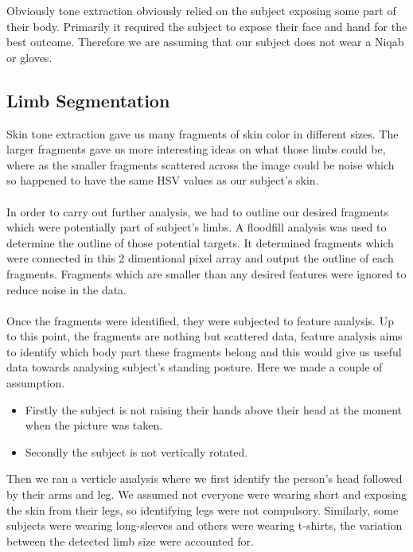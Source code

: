 \documentclass[10pt,journal,compsoc]{IEEEtran}
\begin{document}
Obviously tone extraction obviously relied on the subject exposing some part of their body. Primarily it required the subject to expose their face and hand for the best outcome. Therefore we are assuming that our subject does not wear a Niqab or gloves. 


\subsection{Limb Segmentation}
Skin tone extraction gave us many fragments of skin color in different sizes. The larger fragments gave us more interesting ideas on what those limbs could be, where as the smaller fragments scattered across the image could be noise which so happened to have the same HSV values as our subject's skin.\cite{Marvin}
\\ \\
In order to carry out further analysis, we had to outline our desired fragments which were potentially part of subject's limbs. A floodfill analysis was used to determine the outline of those potential targets. It determined fragments which were connected in this 2 dimentional pixel array and output the outline of each fragments. Fragments which are smaller than any desired features were ignored to reduce noise in the data. 
\\ \\
Once the fragments were identified, they were subjected to feature analysis. Up to this point, the fragments are nothing but scattered data, feature analysis aims to identify which body part these fragments belong and this would give us useful data towards analysing subject's standing posture. Here we made a couple of assumption. 
\begin{itemize}
    \item Firstly the subject is not raising their hands above their head at the moment when the picture was taken. 
    \item Secondly the subject is not vertically rotated. 
\end{itemize}
Then we ran a verticle analysis where we first identify the person's head followed by their arms and leg. We assumed not everyone were wearing short and exposing the skin from their legs, so identifying legs were not compulsory. Similarly, some subjects were wearing long-sleeves and others were wearing t-shirts, the variation between the detected limb size were accounted for.
\end{document}
